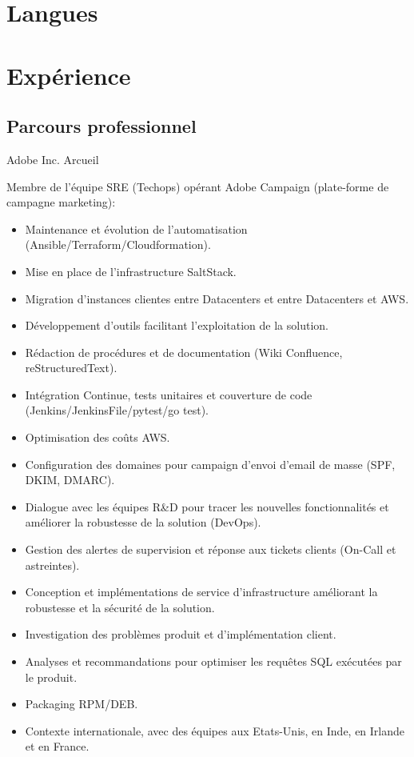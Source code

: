 \documentclass[10pt,a4paper,sans]{moderncv}        %
\begin{document}
\section{Langues}


\section{Expérience}
\subsection{Parcours professionnel}


        {Adobe Inc.}
        {Arcueil}
        {}
        {Membre de l'équipe SRE (Techops) opérant Adobe Campaign (plate-forme de campagne marketing):
            \begin{itemize}
            \item Maintenance et évolution de l'automatisation (Ansible/Terraform/Cloudformation).
            \item Mise en place de l'infrastructure SaltStack.
            \item Migration d'instances clientes entre Datacenters et entre Datacenters et AWS.
            \item Développement d'outils facilitant l'exploitation de la solution.
            \item Rédaction de procédures et de documentation (Wiki Confluence, reStructuredText).
            \item Intégration Continue, tests unitaires et couverture de code (Jenkins/JenkinsFile/pytest/go test).
            \item Optimisation des coûts AWS.
            \item Configuration des domaines pour campaign d'envoi d'email de masse (SPF, DKIM, DMARC).
            \item Dialogue avec les équipes R\&D pour tracer les nouvelles fonctionnalités et améliorer la robustesse de la solution (DevOps).
            \item Gestion des alertes de supervision et réponse aux tickets clients (On-Call et astreintes).
            \item Conception et implémentations de service d'infrastructure améliorant la robustesse et la sécurité de la solution.
            \item Investigation des problèmes produit et d'implémentation client.
            \item Analyses et recommandations pour optimiser les requêtes SQL exécutées par le produit.
            \item Packaging RPM/DEB.
            \item Contexte internationale, avec des équipes aux Etats-Unis, en Inde, en Irlande et en France.
            \end{itemize}
        }
\end{document}
